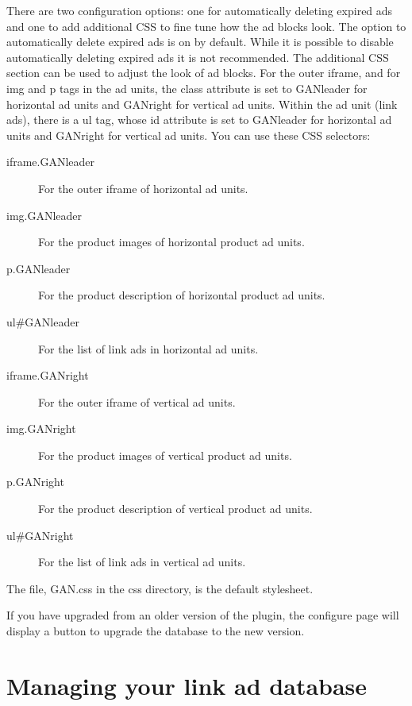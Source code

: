 \documentclass[letterpaper]{article}
\begin{document}
There are two configuration options: one for automatically deleting
expired ads and one to add additional CSS to fine tune how the ad
blocks look.  The option to automatically delete expired ads is on by
default. While it is possible to disable automatically deleting expired
ads it is not recommended.  The additional CSS section can be used to
adjust the look of ad blocks.  For the outer iframe, and for img and p
tags in the ad units, the class attribute is set to GANleader for
horizontal ad units and GANright for vertical ad units.  Within the ad
unit (link ads), there is a ul tag, whose id attribute is set to
GANleader for horizontal ad units and GANright for vertical ad units. 
You can use these CSS selectors:

\begin{description}
  \item[iframe.GANleader] For the outer iframe of horizontal ad units.
  \item[img.GANleader] For the product images of horizontal product ad units.
  \item[p.GANleader] For the product description of horizontal product ad
units.
  \item[ul\#GANleader] For the list of link ads in horizontal ad units.
  \item[iframe.GANright] For the outer iframe of vertical ad units.
  \item[img.GANright] For the product images of vertical product ad
units.
  \item[p.GANright] For the product description of vertical product ad
units.
  \item[ul\#GANright] For the list of link ads in vertical ad units.
\end{description}

The file, GAN.css in the css directory, is the default stylesheet.

If you have upgraded from an older version of the plugin, the
configure page will display a button to upgrade the database to the new
version.

\section{Managing your link ad database}
\end{document}
